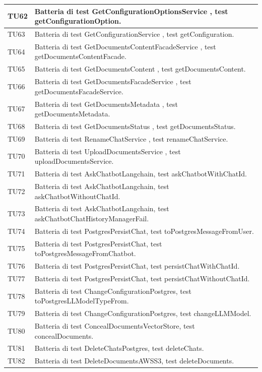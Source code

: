 \documentclass[10pt, a4paper]{article}
\begin{document}
\begin{xltabular}{\textwidth}{p{0.12\textwidth}|X}
\hline
TU62 & Batteria di test GetConfigurationOptionsService , test getConfigurationOption. \\
\hline
TU63 & Batteria di test GetConfigurationService , test getConfiguration. \\
\hline
TU64 & Batteria di test GetDocumentsContentFacadeService , test getDocumentsContentFacade. \\
\hline
TU65 & Batteria di test GetDocumentsContent , test getDocumentsContent. \\
\hline
TU66 & Batteria di test GetDocumentsFacadeService , test getDocumentsFacadeService. \\
\hline
TU67 & Batteria di test GetDocumentsMetadata , test getDocumentsMetadata. \\
\hline
TU68 & Batteria di test GetDocumentsStatus , test getDocumentsStatus. \\
\hline
TU69 & Batteria di test RenameChatService , test renameChatService. \\
\hline
TU70 & Batteria di test UploadDocumentsService , test uploadDocumentsService. \\
\hline
TU71 & Batteria di test AskChatbotLangchain, test askChatbotWithChatId. \\
\hline
TU72 & Batteria di test AskChatbotLangchain, test askChatbotWithoutChatId. \\
\hline
TU73 & Batteria di test AskChatbotLangchain, test askChatbotChatHistoryManagerFail. \\
\hline
TU74 & Batteria di test PostgresPersistChat, test toPostgresMessageFromUser. \\
\hline
TU75 & Batteria di test PostgresPersistChat, test toPostgresMessageFromChatbot. \\
\hline
TU76 & Batteria di test PostgresPersistChat, test persistChatWithChatId. \\
\hline
TU77 & Batteria di test PostgresPersistChat, test persistChatWithoutChatId. \\
\hline
TU78 & Batteria di test ChangeConfigurationPostgres, test toPostgresLLModelTypeFrom. \\
\hline
TU79 & Batteria di test ChangeConfigurationPostgres, test changeLLMModel. \\
\hline
TU80 & Batteria di test ConcealDocumentsVectorStore, test concealDocuments. \\
\hline
TU81 & Batteria di test DeleteChatsPostgres, test deleteChats. \\
\hline
TU82 & Batteria di test DeleteDocumentsAWSS3, test deleteDocuments. \\

\end{xltabular}
\end{document}
